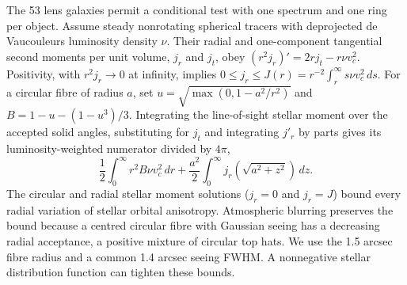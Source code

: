 \documentclass[11pt]{article}
\begin{document}
The 53 lens galaxies permit a conditional test with one spectrum and
one ring per object. Assume steady nonrotating spherical tracers with
deprojected de Vaucouleurs luminosity density $\nu$. Their radial
and one-component tangential second moments per unit volume,
$j_r$ and $j_t$, obey $(r^2j_r)'=2rj_t-r\nu v_c^2$. Positivity,
with $r^2j_r\to0$ at infinity, implies
$0\le j_r\le J(r)=r^{-2}\int_r^\infty s\nu v_c^2\,ds$.
For a circular fibre of radius $a$, set
$u=\sqrt{\max(0,1-a^2/r^2)}$ and $B=1-u-(1-u^3)/3$.
Integrating the line-of-sight stellar moment over the accepted
solid angles, substituting for $j_t$ and integrating $j'_r$ by
parts gives its luminosity-weighted numerator divided by $4\pi$,
\[
 \frac12\int_0^\infty r^2 B\nu v_c^2\,dr
 +\frac{a^2}{2}\int_0^\infty j_r(\sqrt{a^2+z^2})\,dz .
\]
The circular and radial stellar moment solutions ($j_r=0$ and $j_r=J$)
bound every radial variation of stellar orbital anisotropy. Atmospheric
blurring preserves the bound because a centred circular fibre with
Gaussian seeing has a decreasing radial acceptance, a positive mixture
of circular top hats. We use the 1.5 arcsec fibre radius and a common
1.4 arcsec seeing FWHM. A nonnegative stellar distribution function
can tighten these bounds.
\end{document}

